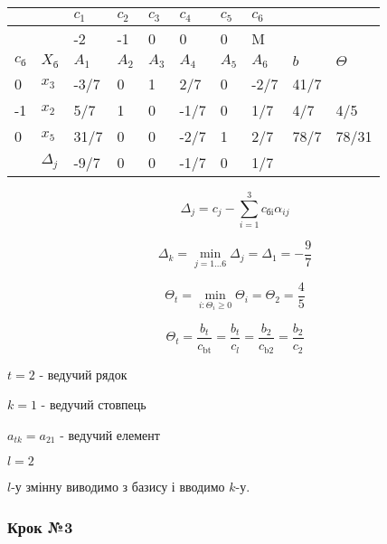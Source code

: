 \documentclass[a4paper, 12pt]{article}
\begin{document}
\begin{table}[H]
    \centering
    \begin{tabular}{|l|l|l|l|l|l|l|l|l|l|}
    \hline
         &  & $c_1$ & $c_2$ & $c_3$ & $c_4$ & $c_5$ & $c_6$ & & \\ \hline
         &  & -2 & -1 & 0 & 0 & 0 & M &  &  \\ \hline
         $c_\text{б}$ & $X_\text{б}$ & $A_1$ & $A_2$ & $A_3$ & $A_4$ & $A_5$ & $A_6$ & $b$  & $\Theta$ \\ \hline
        0 & $x_3$ & -3/7 & 0 & 1 & 2/7 & 0 & -2/7 & 41/7 &  \\ \hline
        -1 & $x_2$ & 5/7 & 1 & 0 & -1/7 & 0 & 1/7 & 4/7 & 4/5 \\ \hline
        0 & $x_5$ & 31/7 & 0 & 0 & -2/7 & 1 & 2/7 & 78/7 & 78/31 \\ \hline
         & $\Delta_j$ & -9/7 & 0 & 0 & -1/7 & 0 & 1/7 &  &  \\ \hline
    \end{tabular}
\end{table}

\begin{equation*}
	\Delta_j = c_j - \sum_{i=1}^{3} c_\text{бi} \alpha_{ij}  
\end{equation*}

\begin{equation*}
	\Delta_k = \min_{j=1 \dots 6} \Delta_j = \Delta_1 = -\frac{9}{7}
\end{equation*}

\begin{equation*}
	\Theta_t = \min_{i: \Theta_i \geqslant 0} \Theta_i = \Theta_2 = \frac{4}{5}
\end{equation*}

\begin{equation*}
	\Theta_t = \frac{b_t}{c_\text{bt}} = \frac{b_t}{c_l} = \frac{b_2}{c_\text{b2}} = \frac{b_2}{c_\text{2}}
\end{equation*}

$t = 2$ - ведучий рядок

$k = 1$ - ведучий стовпець

$a_{tk} = a_{21}$ - ведучий елемент

$l = 2$

$l$-у змінну виводимо з базису і вводимо $k$-у.

\subsubsection{Крок №3}
\end{document}
